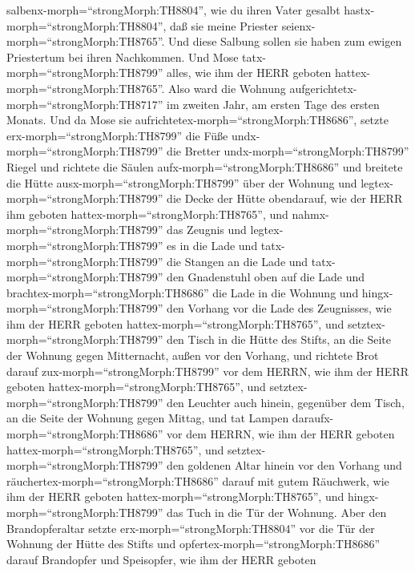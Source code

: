 salbenx-morph=``strongMorph:TH8804'', wie du ihren Vater gesalbt
hastx-morph=``strongMorph:TH8804'', daß sie meine Priester
seienx-morph=``strongMorph:TH8765''. Und diese Salbung sollen sie haben
zum ewigen Priestertum bei ihren Nachkommen.  Und Mose
tatx-morph=``strongMorph:TH8799'' alles, wie ihm der HERR geboten
hattex-morph=``strongMorph:TH8765''.  Also ward die Wohnung
aufgerichtetx-morph=``strongMorph:TH8717'' im zweiten Jahr, am ersten
Tage des ersten Monats.  Und da Mose sie
aufrichtetex-morph=``strongMorph:TH8686'', setzte
erx-morph=``strongMorph:TH8799'' die Füße
undx-morph=``strongMorph:TH8799'' die Bretter
undx-morph=``strongMorph:TH8799'' Riegel und richtete die Säulen
aufx-morph=``strongMorph:TH8686''  und breitete die Hütte
ausx-morph=``strongMorph:TH8799'' über der Wohnung und
legtex-morph=``strongMorph:TH8799'' die Decke der Hütte obendarauf, wie
der HERR ihm geboten hattex-morph=``strongMorph:TH8765'', 
und nahmx-morph=``strongMorph:TH8799'' das Zeugnis und
legtex-morph=``strongMorph:TH8799'' es in die Lade und
tatx-morph=``strongMorph:TH8799'' die Stangen an die Lade und
tatx-morph=``strongMorph:TH8799'' den Gnadenstuhl oben auf die Lade
 und brachtex-morph=``strongMorph:TH8686'' die Lade in die
Wohnung und hingx-morph=``strongMorph:TH8799'' den Vorhang vor die Lade
des Zeugnisses, wie ihm der HERR geboten
hattex-morph=``strongMorph:TH8765'',  und
setztex-morph=``strongMorph:TH8799'' den Tisch in die Hütte des Stifts,
an die Seite der Wohnung gegen Mitternacht, außen vor den Vorhang,
 und richtete Brot darauf zux-morph=``strongMorph:TH8799''
vor dem HERRN, wie ihm der HERR geboten
hattex-morph=``strongMorph:TH8765'',  und
setztex-morph=``strongMorph:TH8799'' den Leuchter auch hinein, gegenüber
dem Tisch, an die Seite der Wohnung gegen Mittag,  und tat
Lampen daraufx-morph=``strongMorph:TH8686'' vor dem HERRN, wie ihm der
HERR geboten hattex-morph=``strongMorph:TH8765'',  und
setztex-morph=``strongMorph:TH8799'' den goldenen Altar hinein vor den
Vorhang  und räuchertex-morph=``strongMorph:TH8686'' darauf
mit gutem Räuchwerk, wie ihm der HERR geboten
hattex-morph=``strongMorph:TH8765'',  und
hingx-morph=``strongMorph:TH8799'' das Tuch in die Tür der Wohnung.
 Aber den Brandopferaltar setzte
erx-morph=``strongMorph:TH8804'' vor die Tür der Wohnung der Hütte des
Stifts und opfertex-morph=``strongMorph:TH8686'' darauf Brandopfer und
Speisopfer, wie ihm der HERR geboten
